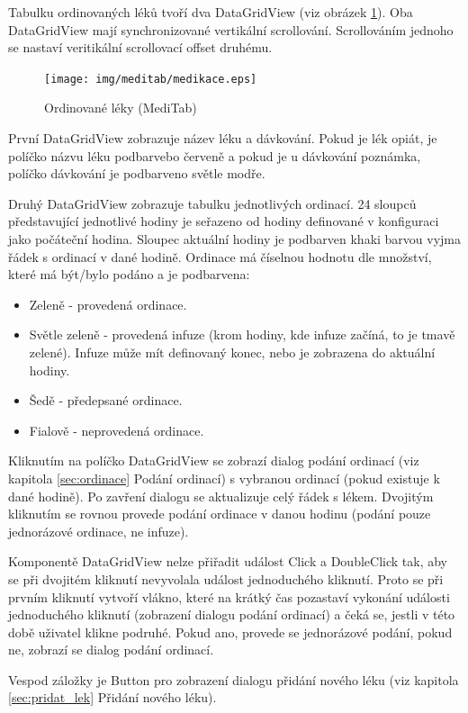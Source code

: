Tabulku ordinovaných léků tvoří dva DataGridView (viz obrázek \ref{fig:medikace}). Oba DataGridView mají synchronizované vertikální scrollování. Scrollováním jednoho se nastaví veritikální scrollovací offset druhému.

\begin{figure}[H]
	\centering
	\texttt{[image: img/meditab/medikace.eps]}
	\caption{Ordinované léky (MediTab)}
  \label{fig:medikace}
\end{figure}

První DataGridView zobrazuje název léku a dávkování. Pokud je lék opiát, je políčko názvu léku podbarvebo červeně a pokud je u dávkování poznámka, políčko dávkování je podbarveno světle modře.

Druhý DataGridView zobrazuje tabulku jednotlivých ordinací. 24 sloupců představující jednotlivé hodiny je seřazeno od hodiny definované v konfiguraci jako počáteční hodina. Sloupec aktuální hodiny je podbarven khaki barvou vyjma řádek s ordinací v dané hodině. Ordinace má číselnou hodnotu dle množství, které má být/bylo podáno a je podbarvena:

\begin{itemize}
	\item Zeleně - provedená ordinace.
	\item Světle zeleně - provedená infuze (krom hodiny, kde infuze začíná, to je tmavě zelené). Infuze může mít definovaný konec, nebo je zobrazena do aktuální hodiny.
	\item Šedě - předepsané ordinace.
	\item Fialově - neprovedená ordinace.
\end{itemize}

Kliknutím na políčko DataGridView se zobrazí dialog podání ordinací (viz kapitola \ref{sec:ordinace} Podání ordinací) s vybranou ordinací (pokud existuje k dané hodině). Po zavření dialogu se aktualizuje celý řádek s lékem. Dvojitým kliknutím se rovnou provede podání ordinace v danou hodinu (podání pouze jednorázové ordinace, ne infuze).

Komponentě DataGridView nelze přiřadit událost Click a DoubleClick tak, aby se při dvojitém kliknutí nevyvolala událost jednoduchého kliknutí. Proto se při prvním kliknutí vytvoří vlákno, které na krátký čas pozastaví vykonání události jednoduchého kliknutí (zobrazení dialogu podání ordinací) a čeká se, jestli v této době uživatel klikne podruhé. Pokud ano, provede se jednorázové podání, pokud ne, zobrazí se dialog podání ordinací.

Vespod záložky je Button pro zobrazení dialogu přidání nového léku (viz kapitola \ref{sec:pridat_lek} Přidání nového léku).



